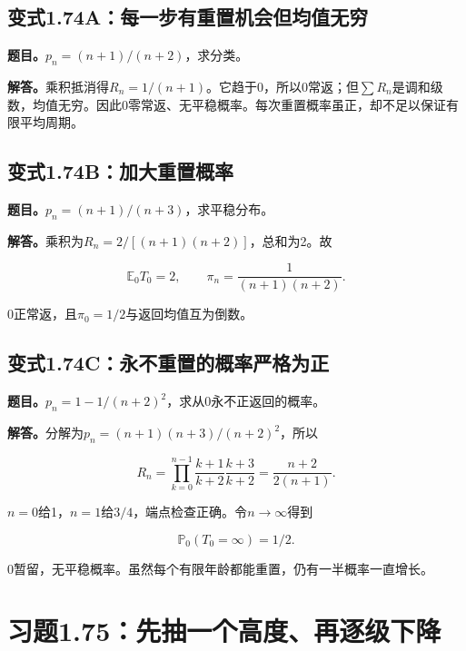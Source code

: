 \documentclass[
  11pt,a4paper,UTF8,fontset=fandol]{ctexart}
\begin{document}
\subsection{变式1.74A：每一步有重置机会但均值无穷}\label{ux53d8ux5f0f1.74aux6bcfux4e00ux6b65ux6709ux91cdux7f6eux673aux4f1aux4f46ux5747ux503cux65e0ux7a77}

\textbf{题目。}\(p_n=(n+1)/(n+2)\)，求分类。

\textbf{解答。}乘积抵消得\(R_n=1/(n+1)\)。它趋于0，所以0常返；但\(\sum R_n\)是调和级数，均值无穷。因此0零常返、无平稳概率。每次重置概率虽正，却不足以保证有限平均周期。

\subsection{变式1.74B：加大重置概率}\label{ux53d8ux5f0f1.74bux52a0ux5927ux91cdux7f6eux6982ux7387}

\textbf{题目。}\(p_n=(n+1)/(n+3)\)，求平稳分布。

\textbf{解答。}乘积为\(R_n=2/[(n+1)(n+2)]\)，总和为2。故

\[\boxed{\mathbb E_0T_0=2,\qquad\pi_n=\frac1{(n+1)(n+2)}.}\]

0正常返，且\(\pi_0=1/2\)与返回均值互为倒数。

\subsection{变式1.74C：永不重置的概率严格为正}\label{ux53d8ux5f0f1.74cux6c38ux4e0dux91cdux7f6eux7684ux6982ux7387ux4e25ux683cux4e3aux6b63}

\textbf{题目。}\(p_n=1-1/(n+2)^2\)，求从0永不正返回的概率。

\textbf{解答。}分解为\(p_n=(n+1)(n+3)/(n+2)^2\)，所以

\[R_n=\prod_{k=0}^{n-1}\frac{k+1}{k+2}\frac{k+3}{k+2}
=\frac{n+2}{2(n+1)}.\]

\(n=0\)给1，\(n=1\)给\(3/4\)，端点检查正确。令\(n\to\infty\)得到

\[\boxed{\mathbb P_0(T_0=\infty)=1/2.}\]

0暂留，无平稳概率。虽然每个有限年龄都能重置，仍有一半概率一直增长。

\section{习题1.75：先抽一个高度、再逐级下降}\label{ux4e60ux98981.75ux5148ux62bdux4e00ux4e2aux9ad8ux5ea6ux518dux9010ux7ea7ux4e0bux964d}
\end{document}
